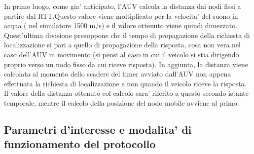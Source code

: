 In primo luogo, come gia' anticipato, l'AUV calcola la distanza dai nodi fissi a partire dal RTT.\newline Questo valore viene moltiplicato per la velocita' del suono in acqua ( nel simulatore 1500 m/s) e il valore ottenuto viene quindi dimezzato.\newline
Quest'ultima divisione presuppone che il tempo di propagazione della richiesta di localizzazione si pari a quello di propagazione della risposta, cosa non vera nel caso dell'AUV in movimento (si pensi al caso in cui il veicolo si stia dirigendo proprio verso un nodo fisso da cui riceve risposta).\newline
In aggiunta, la distanza viene calcolata al momento dello scadere del timer avviato dall'AUV non appena effettuata la richiesta di localizzazione e non quando il veicolo riceve la risposta.\newline
Il valore della distanza ottenuto col calcolo sara' riferito a questo secondo istante temporale, mentre il calcolo della posizione del nodo mobile avviene al primo.\newline

\subsection{Parametri d'interesse e modalita' di funzionamento del protocollo}
